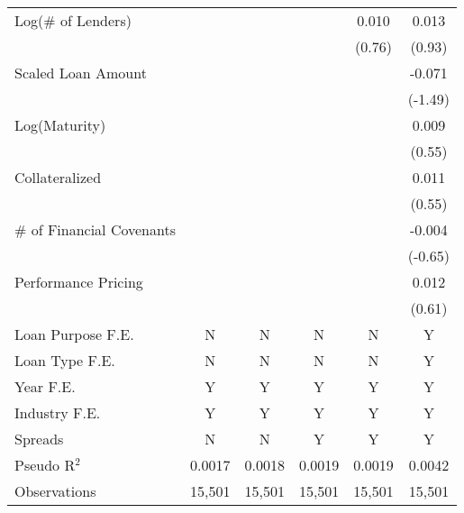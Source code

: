 {\begin{tabular}{l*{5}{c}}
Log(\# of Lenders)&                  &                  &                  &    0.010         &    0.013         \\
                &                  &                  &                  &   (0.76)         &   (0.93)         \\
Scaled Loan Amount&                  &                  &                  &                  &   -0.071         \\
                &                  &                  &                  &                  &  (-1.49)         \\
Log(Maturity)   &                  &                  &                  &                  &    0.009         \\
                &                  &                  &                  &                  &   (0.55)         \\
Collateralized  &                  &                  &                  &                  &    0.011         \\
                &                  &                  &                  &                  &   (0.55)         \\
\# of Financial Covenants&                  &                  &                  &                  &   -0.004         \\
                &                  &                  &                  &                  &  (-0.65)         \\
Performance Pricing&                  &                  &                  &                  &    0.012         \\
                &                  &                  &                  &                  &   (0.61)         \\
\midrule Loan Purpose F.E.&        N         &        N         &        N         &        N         &        Y         \\
Loan Type F.E.  &        N         &        N         &        N         &        N         &        Y         \\
Year F.E.       &        Y         &        Y         &        Y         &        Y         &        Y         \\
Industry F.E.   &        Y         &        Y         &        Y         &        Y         &        Y         \\
Spreads         &        N         &        N         &        Y         &        Y         &        Y         \\

Pseudo R$ ^2 $  &   0.0017         &   0.0018         &   0.0019         &   0.0019         &   0.0042         \\
Observations    &   15,501         &   15,501         &   15,501         &   15,501         &   15,501         \\
\bottomrule
\end{tabular}
}
